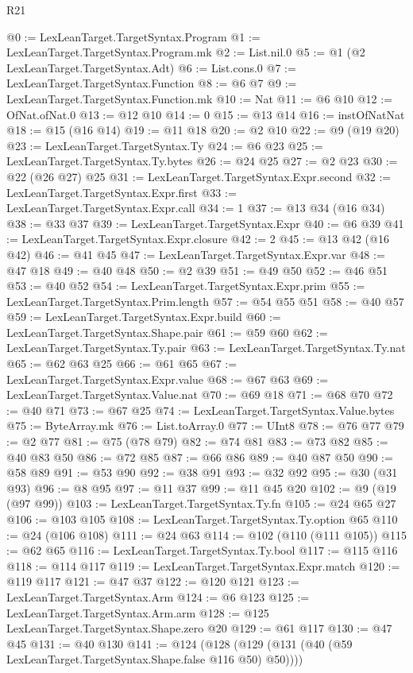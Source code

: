 \begin{lexlean}{R21}
\begin{coremodule}
@0 := LexLeanTarget.TargetSyntax.Program
@1 := LexLeanTarget.TargetSyntax.Program.mk
@2 := List.nil.{0}
@5 := @1 (@2 LexLeanTarget.TargetSyntax.Adt)
@6 := List.cons.{0}
@7 := LexLeanTarget.TargetSyntax.Function
@8 := @6 @7
@9 := LexLeanTarget.TargetSyntax.Function.mk
@10 := Nat
@11 := @6 @10
@12 := OfNat.ofNat.{0}
@13 := @12 @10
@14 := 0
@15 := @13 @14
@16 := instOfNatNat
@18 := @15 (@16 @14)
@19 := @11 @18
@20 := @2 @10
@22 := @9 (@19 @20)
@23 := LexLeanTarget.TargetSyntax.Ty
@24 := @6 @23
@25 := LexLeanTarget.TargetSyntax.Ty.bytes
@26 := @24 @25
@27 := @2 @23
@30 := @22 (@26 @27) @25
@31 := LexLeanTarget.TargetSyntax.Expr.second
@32 := LexLeanTarget.TargetSyntax.Expr.first
@33 := LexLeanTarget.TargetSyntax.Expr.call
@34 := 1
@37 := @13 @34 (@16 @34)
@38 := @33 @37
@39 := LexLeanTarget.TargetSyntax.Expr
@40 := @6 @39
@41 := LexLeanTarget.TargetSyntax.Expr.closure
@42 := 2
@45 := @13 @42 (@16 @42)
@46 := @41 @45
@47 := LexLeanTarget.TargetSyntax.Expr.var
@48 := @47 @18
@49 := @40 @48
@50 := @2 @39
@51 := @49 @50
@52 := @46 @51
@53 := @40 @52
@54 := LexLeanTarget.TargetSyntax.Expr.prim
@55 := LexLeanTarget.TargetSyntax.Prim.length
@57 := @54 @55 @51
@58 := @40 @57
@59 := LexLeanTarget.TargetSyntax.Expr.build
@60 := LexLeanTarget.TargetSyntax.Shape.pair
@61 := @59 @60
@62 := LexLeanTarget.TargetSyntax.Ty.pair
@63 := LexLeanTarget.TargetSyntax.Ty.nat
@65 := @62 @63 @25
@66 := @61 @65
@67 := LexLeanTarget.TargetSyntax.Expr.value
@68 := @67 @63
@69 := LexLeanTarget.TargetSyntax.Value.nat
@70 := @69 @18
@71 := @68 @70
@72 := @40 @71
@73 := @67 @25
@74 := LexLeanTarget.TargetSyntax.Value.bytes
@75 := ByteArray.mk
@76 := List.toArray.{0}
@77 := UInt8
@78 := @76 @77
@79 := @2 @77
@81 := @75 (@78 @79)
@82 := @74 @81
@83 := @73 @82
@85 := @40 @83 @50
@86 := @72 @85
@87 := @66 @86
@89 := @40 @87 @50
@90 := @58 @89
@91 := @53 @90
@92 := @38 @91
@93 := @32 @92
@95 := @30 (@31 @93)
@96 := @8 @95
@97 := @11 @37
@99 := @11 @45 @20
@102 := @9 (@19 (@97 @99))
@103 := LexLeanTarget.TargetSyntax.Ty.fn
@105 := @24 @65 @27
@106 := @103 @105
@108 := LexLeanTarget.TargetSyntax.Ty.option @65
@110 := @24 (@106 @108)
@111 := @24 @63
@114 := @102 (@110 (@111 @105))
@115 := @62 @65
@116 := LexLeanTarget.TargetSyntax.Ty.bool
@117 := @115 @116
@118 := @114 @117
@119 := LexLeanTarget.TargetSyntax.Expr.match
@120 := @119 @117
@121 := @47 @37
@122 := @120 @121
@123 := LexLeanTarget.TargetSyntax.Arm
@124 := @6 @123
@125 := LexLeanTarget.TargetSyntax.Arm.arm
@128 := @125 LexLeanTarget.TargetSyntax.Shape.zero @20
@129 := @61 @117
@130 := @47 @45
@131 := @40 @130
@141 := @124 (@128 (@129 (@131 (@40 (@59 LexLeanTarget.TargetSyntax.Shape.false @116 @50) @50))))

\end{coremodule}
\end{lexlean}
